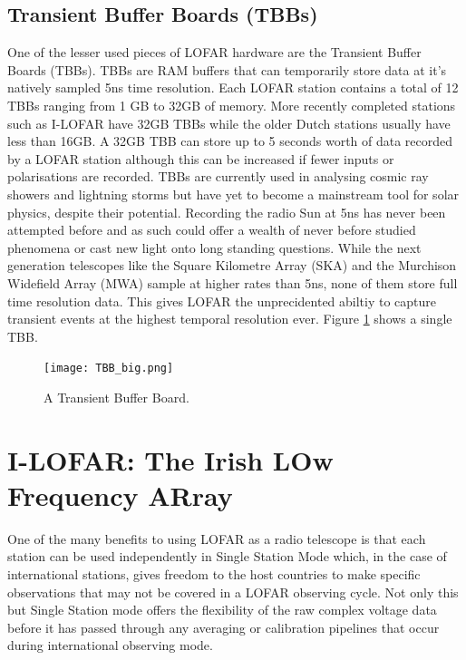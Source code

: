 \subsection{Transient Buffer Boards (TBBs)}
\label{sec:tbb}
One of the lesser used pieces of LOFAR hardware are the Transient Buffer Boards (TBBs). TBBs are RAM buffers that can temporarily store data at it's natively sampled 5ns time resolution. Each LOFAR station contains a total of 12 TBBs ranging from 1 GB to 32GB of memory. More recently completed stations such as I-LOFAR have 32GB TBBs while the older Dutch stations usually have less than 16GB.
A 32GB TBB can store up to 5 seconds worth of data recorded by a LOFAR station although this can be increased if fewer inputs or polarisations are recorded. TBBs are currently used in analysing cosmic ray showers \citep{Mulrey2020} and lightning storms \citep{Hare2018} but have yet to become a mainstream tool for solar physics, despite their potential. 
Recording the radio Sun at 5ns has never been attempted before and as such could offer a wealth of never before studied phenomena or cast new light onto long standing questions.
While the next generation telescopes like the Square Kilometre Array (SKA) and the Murchison Widefield Array (MWA) sample at higher rates than 5ns, none of them store full time resolution data. This gives LOFAR the unprecidented abiltiy to capture transient events at the highest temporal resolution ever. Figure \ref{fig:TBB} shows a single TBB.

\begin{figure}
\centering
\texttt{[image: TBB\_big.png]}
\caption[A Transient Buffer Board.]{A Transient Buffer Board.}
\label{fig:TBB}
\end{figure}

\section{I-LOFAR: The Irish LOw Frequency ARray}
One of the many benefits to using LOFAR as a radio telescope is that each station can be used independently in Single Station Mode which, in the case of international stations, gives freedom to the host countries to make specific observations that may not be covered in a LOFAR observing cycle. Not only this but Single Station mode offers the flexibility of the raw complex voltage data before it has passed through any averaging or calibration pipelines that occur during international observing mode.

